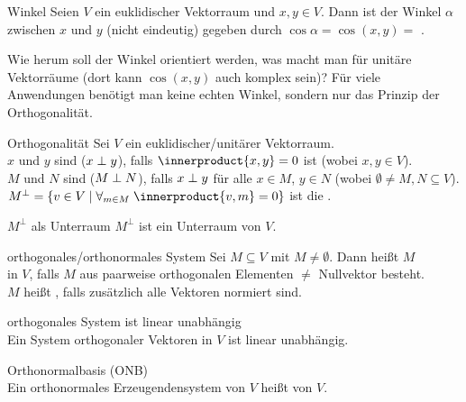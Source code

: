\begin{Def}{Winkel}
    Seien $V$ ein euklidischer Vektorraum und $x, y \in V$.
    Dann ist der Winkel $\alpha$ zwischen $x$ und $y$ (nicht eindeutig) gegeben
    durch $\cos \alpha = \cos(x, y) =$
    .
\end{Def}

\begin{Bem}
    Wie herum soll der Winkel orientiert werden, was macht man für unitäre
    Vektorräume (dort kann $\cos(x, y)$ auch komplex sein)?
    Für viele Anwendungen benötigt man keine echten Winkel, sondern nur das
    Prinzip der Orthogonalität.
\end{Bem}

\begin{Def}{Orthogonalität}
    Sei $V$ ein euklidischer/unitärer Vektorraum. \\
    $x$ und $y$ sind  ($x \;\bot\; y$), falls
    $\innerproduct{x, y} = 0$ ist (wobei $x, y \in V$). \\
    $M$ und $N$ sind  ($M \;\bot\; N$), falls $x \;\bot\; y$ für
    alle $x \in M$, $y \in N$ (wobei $\emptyset \not= M, N \subseteq V$). \\
    $M^\bot = \{v \in V \;|\; \forall_{m \in M}\; \innerproduct{v, m} = 0\}$ ist die
    .
\end{Def}

\begin{Lemma}{$M^\bot$ als Unterraum}
    $M^\bot$ ist ein Unterraum von $V$.
\end{Lemma}

\begin{Def}{orthogonales/orthonormales System}
    Sei $M \subseteq V$ mit $M \not= \emptyset$.
    Dann heißt $M$ \\
     in $V$, falls
    $M$ aus paarweise orthogonalen Elementen $\not=$ Nullvektor besteht. \\
    $M$ heißt , falls zusätzlich alle Vektoren
    normiert sind.
\end{Def}

\begin{Satz}{orthogonales System ist linear unabhängig} \\
    Ein System orthogonaler Vektoren in $V$ ist linear unabhängig.
\end{Satz}

\begin{Def}{Orthonormalbasis (ONB)} \\
    Ein orthonormales Erzeugendensystem von $V$ heißt
     von $V$.
\end{Def}

